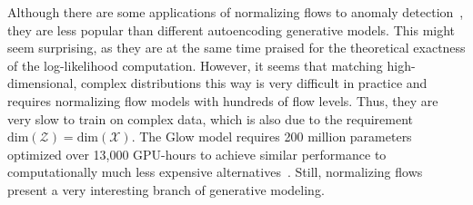 Although there are some applications of normalizing flows to anomaly detection~\cite{kirichenkoWhyNormalizingFlows2020, dias2020anomaly, rudolph2021same, gudovskiy2022cflow}, they are less popular than different autoencoding generative models. This might seem surprising, as they are at the same time praised for the theoretical exactness of the log-likelihood computation. However, it seems that matching high-dimensional, complex distributions this way is very difficult in practice and requires normalizing flow models with hundreds of flow levels. Thus, they are very slow to train on complex data, which is also due to the requirement $\text{dim}(\mathcal{Z}) = \text{dim}(\mathcal{X})$. The Glow model requires 200 million parameters optimized over 13,000 GPU-hours to achieve similar performance to computationally much less expensive alternatives~\cite{kingma2018glow}. Still, normalizing flows present a very interesting branch of generative modeling.



